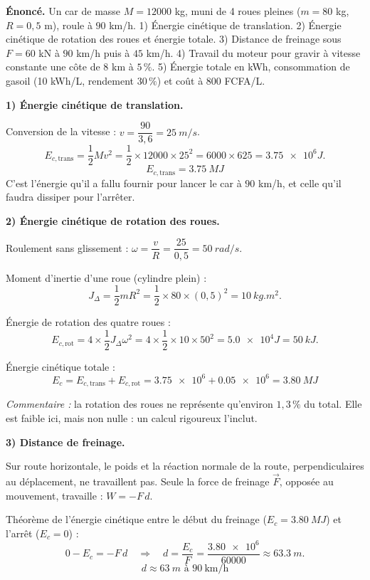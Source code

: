 \documentclass[11pt]{article}
\newcounter{popsec}
\newcounter{popsub}
\newcommand{\courssub}[1]{%
  \stepcounter{popsub}%
  \par\vspace{9pt}\noindent{\popxbold\fontsize{11.5}{13}\selectfont\color{popink}{\color{poporange}\thepopsec.\thepopsub}\hspace{6pt}#1}\par\nopagebreak\vspace{4pt}
}
\begin{document}
\courssub{Démarche et corrigé commenté}

\begin{exoresolu}
\textbf{Énoncé.} Un car de masse $M = \num{12000}$ kg, muni de 4 roues pleines ($m = 80$ kg, $R = 0,5$ m), roule à $90$ km/h. 1) Énergie cinétique de translation. 2) Énergie cinétique de rotation des roues et énergie totale. 3) Distance de freinage sous $F = 60$ kN à $90$ km/h puis à $45$ km/h. 4) Travail du moteur pour gravir à vitesse constante une côte de $8$ km à $5\,\%$. 5) Énergie totale en kWh, consommation de gasoil (10 kWh/L, rendement $30\,\%$) et coût à $800$ FCFA/L.

\tcblower

\textbf{1) Énergie cinétique de translation.}

Conversion de la vitesse : $v = \dfrac{90}{3,6} = \SI{25}{m/s}$.
\[
E_{c,\text{trans}} = \frac{1}{2}Mv^{2} = \frac{1}{2}\times \num{12000}\times 25^{2} = \num{6000}\times 625 = \num{3,75e6}{J}.
\]
\[
\boxed{E_{c,\text{trans}} = \SI{3,75}{MJ}}
\]
C'est l'énergie qu'il a fallu fournir pour lancer le car à $90$ km/h, et celle qu'il faudra dissiper pour l'arrêter.

\textbf{2) Énergie cinétique de rotation des roues.}

Roulement sans glissement : $\omega = \dfrac{v}{R} = \dfrac{25}{0,5} = \SI{50}{rad/s}$.

Moment d'inertie d'une roue (cylindre plein) :
\[
J_{\Delta} = \frac{1}{2}mR^{2} = \frac{1}{2}\times 80\times (0,5)^{2} = \SI{10}{kg.m^{2}}.
\]

Énergie de rotation des quatre roues :
\[
E_{c,\text{rot}} = 4\times\frac{1}{2}J_{\Delta}\omega^{2} = 4\times\frac{1}{2}\times 10\times 50^{2} = \num{5,0e4}{J} = \SI{50}{kJ}.
\]

Énergie cinétique totale :
\[
\boxed{E_c = E_{c,\text{trans}} + E_{c,\text{rot}} = \num{3,75e6} + \num{0,05e6} = \SI{3,80}{MJ}}
\]

\emph{Commentaire :} la rotation des roues ne représente qu'environ $1,3\,\%$ du total. Elle est faible ici, mais non nulle : un calcul rigoureux l'inclut.

\textbf{3) Distance de freinage.}

Sur route horizontale, le poids et la réaction normale de la route, perpendiculaires au déplacement, ne travaillent pas. Seule la force de freinage $\vec{F}$, opposée au mouvement, travaille : $W = -F\,d$.

Théorème de l'énergie cinétique entre le début du freinage ($E_c = \SI{3,80}{MJ}$) et l'arrêt ($E_c = 0$) :
\[
0 - E_c = -F\,d \quad\Longrightarrow\quad d = \frac{E_c}{F} = \frac{\num{3,80e6}}{\num{60000}} \approx \SI{63,3}{m}.
\]
\[
\boxed{d \approx \SI{63}{m} \text{ à } 90\ \text{km/h}}
\]


\end{exoresolu}
\end{document}
